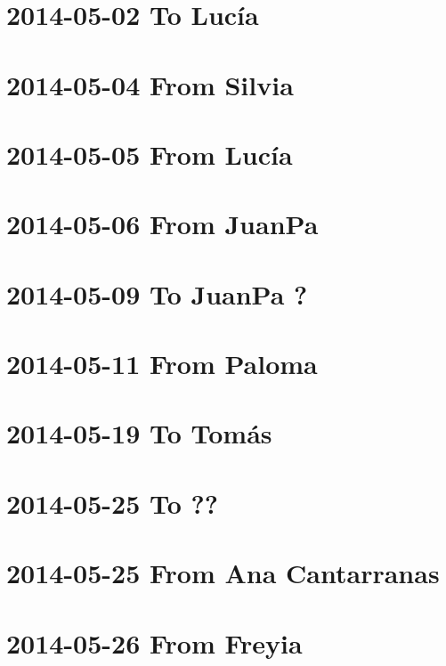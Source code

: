 \documentclass[]{book}
\begin{document}
\hypertarget{to-lucia-4}{%
\section{2014-05-02 To Lucía}\label{to-lucia-4}}

\hypertarget{from-silvia}{%
\section{2014-05-04 From Silvia}\label{from-silvia}}

\hypertarget{from-lucia-4}{%
\section{2014-05-05 From Lucía}\label{from-lucia-4}}

\hypertarget{from-juanpa}{%
\section{2014-05-06 From JuanPa}\label{from-juanpa}}

\hypertarget{to-juanpa}{%
\section{2014-05-09 To JuanPa ?}\label{to-juanpa}}

\hypertarget{from-paloma-2}{%
\section{2014-05-11 From Paloma}\label{from-paloma-2}}

\hypertarget{to-tomas-8}{%
\section{2014-05-19 To Tomás}\label{to-tomas-8}}

\hypertarget{to}{%
\section{2014-05-25 To ??}\label{to}}

\hypertarget{from-ana-cantarranas}{%
\section{2014-05-25 From Ana Cantarranas}\label{from-ana-cantarranas}}

\hypertarget{from-freyia}{%
\section{2014-05-26 From Freyia}\label{from-freyia}}
\end{document}
